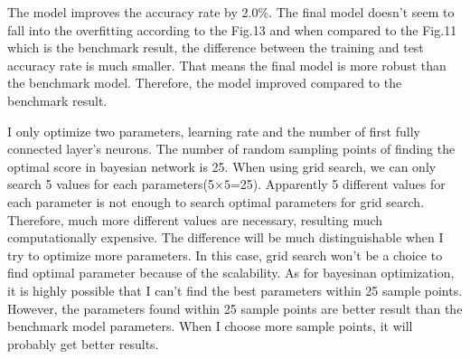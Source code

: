 
The model improves the accuracy rate by 2.0\%. The final model doesn't seem to fall into the overfitting according to the Fig.13 and when compared to the Fig.11 which is the benchmark result, the difference between the training and test accuracy rate is much smaller. That means the final model is more robust than the benchmark model. Therefore, the model improved compared to the benchmark result.

I only optimize two parameters, learning rate and the number of first fully connected layer's neurons. The number of random sampling points of finding the optimal score in bayesian network is 25.  When using grid search, we can only search 5 values for each parameters(5$\times5$=25). Apparently 5 different values for each parameter is not enough to search optimal parameters for grid search. Therefore, much more different values are necessary, resulting much computationally expensive. The difference will be much distinguishable when I try to optimize more parameters. In this case, grid search won't be a choice to find optimal parameter because of the scalability.  As for bayesinan optimization, it is highly possible that I can't find the best parameters within 25 sample points. However, the parameters found within 25 sample points are better result than the benchmark model parameters. When I choose more sample points, it will probably get better results. 




